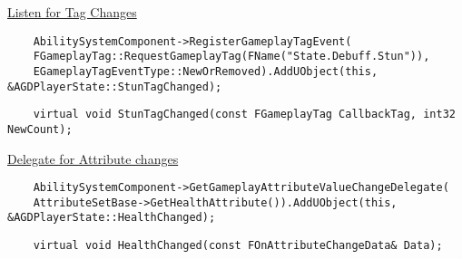         \uline{Listen for Tag Changes}
        \begin{lstlisting}
    AbilitySystemComponent->RegisterGameplayTagEvent(
    FGameplayTag::RequestGameplayTag(FName("State.Debuff.Stun")),
    EGameplayTagEventType::NewOrRemoved).AddUObject(this, &AGDPlayerState::StunTagChanged);
        \end{lstlisting}
        \begin{lstlisting}
    virtual void StunTagChanged(const FGameplayTag CallbackTag, int32 NewCount);
        \end{lstlisting}

        \uline{Delegate for Attribute changes}
        \begin{lstlisting}
    AbilitySystemComponent->GetGameplayAttributeValueChangeDelegate(
    AttributeSetBase->GetHealthAttribute()).AddUObject(this, &AGDPlayerState::HealthChanged);
        \end{lstlisting}

        \begin{lstlisting}
    virtual void HealthChanged(const FOnAttributeChangeData& Data);
        \end{lstlisting}
